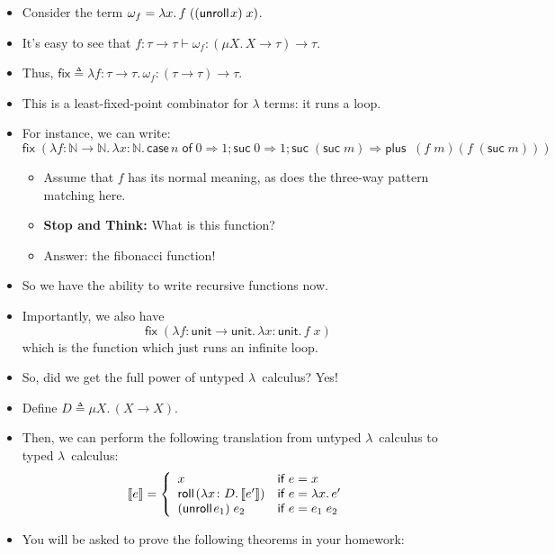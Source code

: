 \documentclass{lecturenotes}
\newcommand{\abs}[2]{\ensuremath{\lambda #1.\,#2}}
\newcommand{\tabs}[3]{\ensuremath{\lambda #1 \colon #2.\,#3}}
\newcommand{\app}[2]{\ensuremath{#1\;#2}}
\newcommand{\utype}{\textsf{unit}\xspace}
\newcommand{\rectype}[2]{\ensuremath{\mu #1.\,#2}}
\newcommand{\roll}[1]{\textsf{roll}\mkern2mu#1}
\newcommand{\unroll}[1]{\textsf{unroll}\mkern2mu#1}
\begin{document}
\begin{itemize}
\item Consider the term $\omega_f = \abs{x}{\app{f}{(\app{(\unroll{x})}{x})}}$.
\item It's easy to see that $f : \tau \to \tau \vdash \omega_f : (\rectype{X}{X \to \tau}) \to \tau$.
\item Thus, $\textsf{fix} \triangleq \tabs{f}{\tau \to \tau}{\omega_f} : (\tau \to \tau) \to \tau$.
\item This is a least-fixed-point combinator for $\lambda$ terms: it runs a loop.
\item For instance, we can write:
  $$\app{\textsf{fix}}{\left(\tabs{f}{\mathbb{N} \to \mathbb{N}}{\tabs{x}{\mathbb{N}}{\textsf{case}\,n \mathrel{\textsf{of}} 0 \Rightarrow 1; \app{\textsf{suc}}{0} \Rightarrow 1; \app{\textsf{suc}}{(\app{\textsf{suc}}{m})} \Rightarrow \app{\app{\textsf{plus}}}{(\app{f}{m})}{(\app{f}{(\app{\textsf{suc}}{m})})}}}\right)}$$
  \begin{itemize}
  \item Assume that $f$ has its normal meaning, as does the three-way pattern matching here.
  \item \textbf{Stop and Think:} What is this function?
  \item Answer: the fibonacci function!
  \end{itemize}
\item So we have the ability to write recursive functions now.
\item Importantly, we also have $$\app{\textsf{fix}}{(\tabs{f}{\utype \to \utype}{\tabs{x}{\utype}{\app{f}{x}}})}$$ which is the function which just runs an infinite loop.
\item So, did we get the full power of untyped $\lambda$~calculus?
  Yes!
\item Define $D \triangleq \rectype{X}{(X \to X)}$.
\item Then, we can perform the following translation from untyped $\lambda$~calculus to typed $\lambda$~calculus:
  $$\llbracket e \rrbracket = \left\{\begin{array}{ll}
    x & \textsf{if}~e = x\\
    \roll{(\tabs{x}{D}{\llbracket e' \rrbracket})} & \textsf{if}~e = \abs{x}{e'}\\
    \app{(\unroll{e_1})}{e_2} & \textsf{if}~e = \app{e_1}{e_2}
  \end{array}\right.
$$
\item You will be asked to prove the following theorems in your homework:
\end{itemize}
\end{document}
